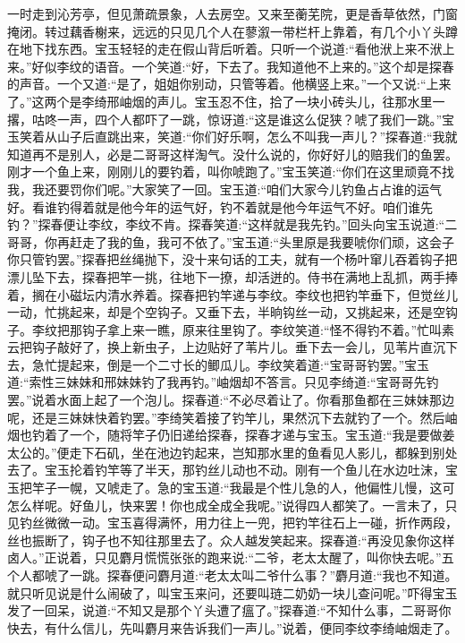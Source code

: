 \begin{parag}
    一时走到沁芳亭，但见萧疏景象，人去房空。又来至蘅芜院，更是香草依然，门窗掩闭。转过藕香榭来，远远的只见几个人在蓼溆一带栏杆上靠着，有几个小丫头蹲在地下找东西。宝玉轻轻的走在假山背后听着。只听一个说道:“看他洑上来不洑上来。”好似李纹的语音。一个笑道:“好，下去了。我知道他不上来的。”这个却是探春的声音。一个又道:“是了，姐姐你别动，只管等着。他横竖上来。”一个又说:“上来了。”这两个是李绮邢岫烟的声儿。宝玉忍不住，拾了一块小砖头儿，往那水里一撂，咕咚一声，四个人都吓了一跳，惊讶道:“这是谁这么促狭？唬了我们一跳。”宝玉笑着从山子后直跳出来，笑道:“你们好乐啊，怎么不叫我一声儿？”探春道:“我就知道再不是别人，必是二哥哥这样淘气。没什么说的，你好好儿的赔我们的鱼罢。刚才一个鱼上来，刚刚儿的要钓着，叫你唬跑了。”宝玉笑道:“你们在这里顽竟不找我，我还要罚你们呢。”大家笑了一回。宝玉道:“咱们大家今儿钓鱼占占谁的运气好。看谁钓得着就是他今年的运气好，钓不着就是他今年运气不好。咱们谁先钓？”探春便让李纹，李纹不肯。探春笑道:“这样就是我先钓。”回头向宝玉说道:“二哥哥，你再赶走了我的鱼，我可不依了。”宝玉道:“头里原是我要唬你们顽，这会子你只管钓罢。”探春把丝绳抛下，没十来句话的工夫，就有一个杨叶窜儿吞着钩子把漂儿坠下去，探春把竿一挑，往地下一撩，却活迸的。侍书在满地上乱抓，两手捧着，搁在小磁坛内清水养着。探春把钓竿递与李纹。李纹也把钓竿垂下，但觉丝儿一动，忙挑起来，却是个空钩子。又垂下去，半晌钩丝一动，又挑起来，还是空钩子。李纹把那钩子拿上来一瞧，原来往里钩了。李纹笑道:“怪不得钓不着。”忙叫素云把钩子敲好了，换上新虫子，上边贴好了苇片儿。垂下去一会儿，见苇片直沉下去，急忙提起来，倒是一个二寸长的鲫瓜儿。李纹笑着道:“宝哥哥钓罢。”宝玉道:“索性三妹妹和邢妹妹钓了我再钓。”岫烟却不答言。只见李绮道:“宝哥哥先钓罢。”说着水面上起了一个泡儿。探春道:“不必尽着让了。你看那鱼都在三妹妹那边呢，还是三妹妹快着钓罢。”李绮笑着接了钓竿儿，果然沉下去就钓了一个。然后岫烟也钓着了一个，随将竿子仍旧递给探春，探春才递与宝玉。宝玉道:“我是要做姜太公的。”便走下石矶，坐在池边钓起来，岂知那水里的鱼看见人影儿，都躲到别处去了。宝玉抡着钓竿等了半天，那钓丝儿动也不动。刚有一个鱼儿在水边吐沫，宝玉把竿子一幌，又唬走了。急的宝玉道:“我最是个性儿急的人，他偏性儿慢，这可怎么样呢。好鱼儿，快来罢！你也成全成全我呢。”说得四人都笑了。一言未了，只见钓丝微微一动。宝玉喜得满怀，用力往上一兜，把钓竿往石上一碰，折作两段，丝也振断了，钩子也不知往那里去了。众人越发笑起来。探春道:“再没见象你这样卤人。”正说着，只见麝月慌慌张张的跑来说:“二爷，老太太醒了，叫你快去呢。”五个人都唬了一跳。探春便问麝月道:“老太太叫二爷什么事？”麝月道:“我也不知道。就只听见说是什么闹破了，叫宝玉来问，还要叫琏二奶奶一块儿查问呢。”吓得宝玉发了一回呆，说道:“不知又是那个丫头遭了瘟了。”探春道:“不知什么事，二哥哥你快去，有什么信儿，先叫麝月来告诉我们一声儿。”说着，便同李纹李绮岫烟走了。
\end{parag}


